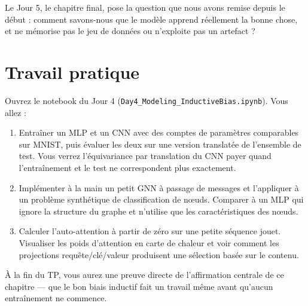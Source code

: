 Le Jour 5, le chapitre final, pose la question que nous avons remise depuis le début : comment savons-nous que le modèle apprend réellement la bonne chose, et ne mémorise pas le jeu de données ou n'exploite pas un artefact ?

\section*{Travail pratique}

Ouvrez le notebook du Jour 4 (\texttt{Day4\_Modeling\_InductiveBias.ipynb}). Vous allez :

\begin{enumerate}
  \item Entraîner un MLP et un CNN avec des comptes de paramètres comparables sur MNIST, puis évaluer les deux sur une version translatée de l'ensemble de test. Vous verrez l'équivariance par translation du CNN payer quand l'entraînement et le test ne correspondent plus exactement.
  \item Implémenter à la main un petit GNN à passage de messages et l'appliquer à un problème synthétique de classification de nœuds. Comparer à un MLP qui ignore la structure du graphe et n'utilise que les caractéristiques des nœuds.
  \item Calculer l'auto-attention à partir de zéro sur une petite séquence jouet. Visualiser les poids d'attention en carte de chaleur et voir comment les projections requête/clé/valeur produisent une sélection basée sur le contenu.
\end{enumerate}

À la fin du TP, vous aurez une preuve directe de l'affirmation centrale de ce chapitre --- que le bon biais inductif fait un travail même avant qu'aucun entraînement ne commence.
